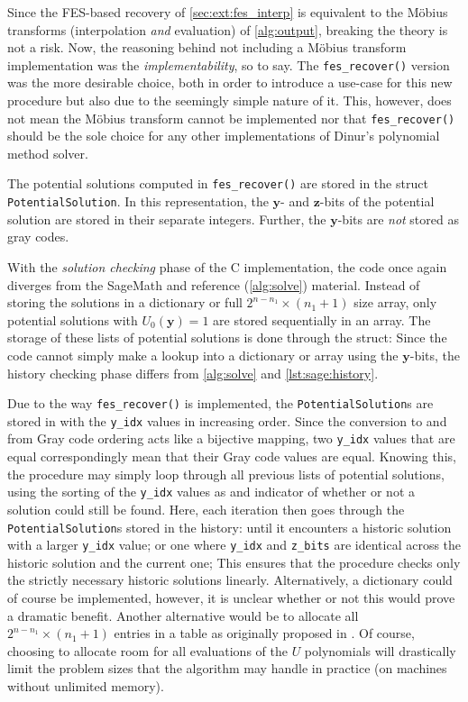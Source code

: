 Since the FES-based recovery of \cref{sec:ext:fes_interp} is equivalent to the Möbius transforms (interpolation \textit{and} evaluation) of \cref{alg:output}, breaking the theory is not a risk. Now, the reasoning behind not including a Möbius transform implementation was the \textit{implementability}, so to say. The \texttt{fes\_recover()} version was the more desirable choice, both in order to introduce a use-case for this new procedure but also due to the seemingly simple nature of it. This, however, does not mean the Möbius transform cannot be implemented nor that \texttt{fes\_recover()} should be the sole choice for any other implementations of Dinur's polynomial method solver.

The potential solutions computed in \texttt{fes\_recover()} are stored in the struct \texttt{PotentialSolution}. In this representation, the $\mathbf{y}$- and $\mathbf{z}$-bits of the potential solution are stored in their separate integers. Further, the $\mathbf{y}$-bits are \textit{not} stored as gray codes.

With the \textit{solution checking} phase of the C implementation, the code once again diverges from the SageMath and reference (\cref{alg:solve}) material. Instead of storing the solutions in a dictionary or full $2^{n - n_1} \times (n_1 + 1)$ size array, only potential solutions with $U_0(\mathbf{y}) = 1$ are stored sequentially in an array. The storage of these lists of potential solutions is done through the struct:
Since the code cannot simply make a lookup into a dictionary or array using the $\mathbf{y}$-bits, the history checking phase differs from \cref{alg:solve} and \cref{lst:sage:history}. 

Due to the way \texttt{fes\_recover()} is implemented, the \texttt{PotentialSolution}s are stored in with the \texttt{y\_idx} values in increasing order. Since the conversion to and from Gray code ordering acts like a bijective mapping, two \texttt{y\_idx} values that are equal correspondingly mean that their Gray code values are equal. Knowing this, the procedure may simply loop through all previous lists of potential solutions, using the sorting of the \texttt{y\_idx} values as and indicator of whether or not a solution could still be found.
Here, each iteration then goes through the \texttt{PotentialSolution}s stored in the history:
until it encounters a historic solution with a larger \texttt{y\_idx} value; 
or one where \texttt{y\_idx} and \texttt{z\_bits} are identical across the historic solution and the current one;
This ensures that the procedure checks only the strictly necessary historic solutions linearly. Alternatively, a dictionary could of course be implemented, however, it is unclear whether or not this would prove a dramatic benefit. Another alternative would be to allocate all $2^{n - n_1} \times (n_1 + 1)$ entries in a table as originally proposed in \cite{eurocrypt-2021-30841}. Of course, choosing to allocate room for all evaluations of the $U$ polynomials will drastically limit the problem sizes that the algorithm may handle in practice (on machines without unlimited memory).

